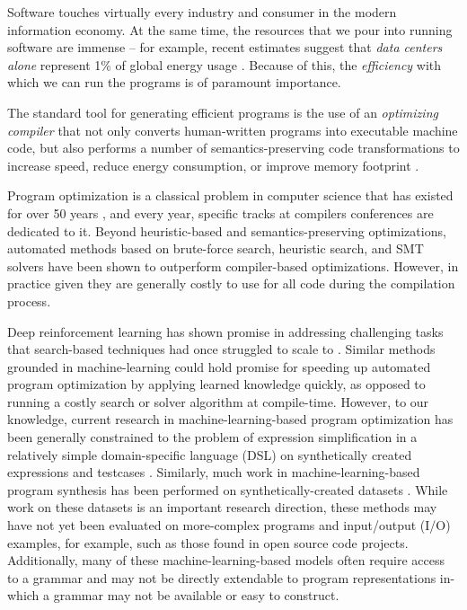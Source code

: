 \documentclass{article}
\begin{document}
Software touches virtually every industry and consumer in the modern information economy.
At the same time, the resources that we pour into running software are immense -- for example, recent estimates suggest that \emph{data centers alone} represent 1\% of global energy usage \citep{masanet2020recalibrating}.
Because of this, the \emph{efficiency} with which we can run the programs is of paramount importance.

The standard tool for generating efficient programs is the use of an \emph{optimizing compiler} that not only converts human-written programs into executable machine code, but also performs a number of semantics-preserving code transformations to increase speed, reduce energy consumption, or improve memory footprint \citep{dragonbook}.

Program optimization is a classical problem in computer science that has existed for over 50 years \cite{mckeeman1965peephole, allen1971}, and every year, specific tracks at compilers conferences are dedicated to it. Beyond heuristic-based and semantics-preserving optimizations, automated methods based on brute-force search, heuristic search, and SMT solvers have been shown to outperform compiler-based optimizations. However, in practice given they are generally costly to use for all code during the compilation process. 

Deep reinforcement learning has shown promise in addressing challenging tasks that search-based techniques had once struggled to scale to \cite{silver2017mastering}. Similar methods grounded in machine-learning could hold promise for speeding up automated program optimization by applying learned knowledge quickly, as opposed to running a costly search or solver algorithm at compile-time. However, to our knowledge, current research in machine-learning-based program optimization has been generally constrained to the problem of expression simplification in a relatively simple domain-specific language (DSL) on synthetically created expressions and testcases \cite{shi2020}. Similarly, much work in machine-learning-based program synthesis  has been performed on synthetically-created datasets \cite{parisotto2016neuro,bunel2018leveraging}. While work on these datasets is an important research direction, these methods may have not yet been evaluated on more-complex programs and input/output (I/O) examples, for example, such as those found in open source code projects. Additionally, many of these machine-learning-based models often require access to a grammar and may not be directly extendable to program representations in-which a grammar may not be available or easy to construct.
\end{document}
